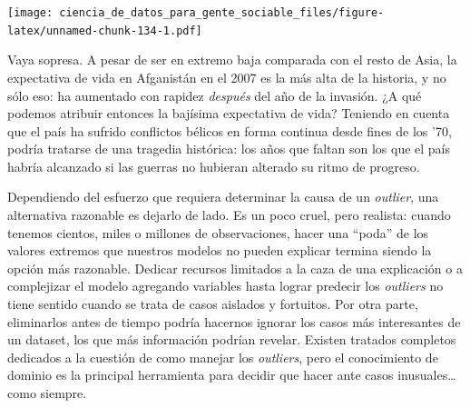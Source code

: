 \documentclass[]{book}
\newenvironment{Shaded}{\begin{snugshade}}{\end{snugshade}}
\newcommand{\KeywordTok}[1]{\textcolor[rgb]{0.13,0.29,0.53}{\textbf{#1}}}
\newcommand{\DataTypeTok}[1]{\textcolor[rgb]{0.13,0.29,0.53}{#1}}
\newcommand{\StringTok}[1]{\textcolor[rgb]{0.31,0.60,0.02}{#1}}
\newcommand{\OperatorTok}[1]{\textcolor[rgb]{0.81,0.36,0.00}{\textbf{#1}}}
\newcommand{\NormalTok}[1]{#1}
\begin{document}
\begin{Shaded}
\end{Shaded}

\texttt{[image: ciencia\_de\_datos\_para\_gente\_sociable\_files/figure-latex/unnamed-chunk-134-1.pdf]}

Vaya sopresa. A pesar de ser en extremo baja comparada con el resto de
Asia, la expectativa de vida en Afganistán en el 2007 es la más alta de
la historia, y no sólo eso: ha aumentado con rapidez \emph{después} del
año de la invasión. ¿A qué podemos atribuir entonces la bajísima
expectativa de vida? Teniendo en cuenta que el país ha sufrido
conflictos bélicos en forma continua desde fines de los '70, podría
tratarse de una tragedia histórica: los años que faltan son los que el
país habría alcanzado si las guerras no hubieran alterado su ritmo de
progreso.

Dependiendo del esfuerzo que requiera determinar la causa de un
\emph{outlier}, una alternativa razonable es dejarlo de lado. Es un poco
cruel, pero realista: cuando tenemos cientos, miles o millones de
observaciones, hacer una ``poda'' de los valores extremos que nuestros
modelos no pueden explicar termina siendo la opción más razonable.
Dedicar recursos limitados a la caza de una explicación o a complejizar
el modelo agregando variables hasta lograr predecir los \emph{outliers}
no tiene sentido cuando se trata de casos aislados y fortuitos. Por otra
parte, eliminarlos antes de tiempo podría hacernos ignorar los casos más
interesantes de un dataset, los que más información podrían revelar.
Existen tratados completos dedicados a la cuestión de como manejar los
\emph{outliers}, pero el conocimiento de dominio es la principal
herramienta para decidir que hacer ante casos inusuales\ldots{} como
siempre.
\end{document}

